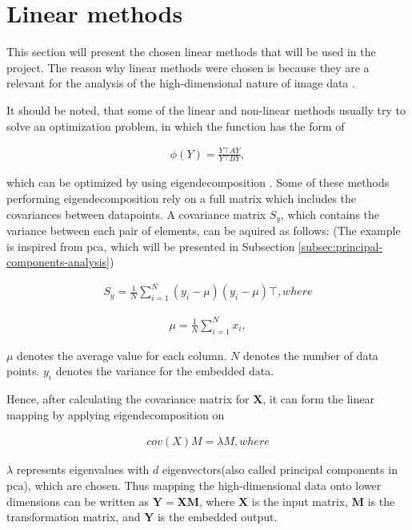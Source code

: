 \section{Linear methods}\label{sec:linear-methods}
This section will present the chosen linear methods that will be used in the project. The reason why linear methods were chosen is because they are a relevant for the analysis of the high-dimensional nature of image data \cite{linear-dimensionality-reduction-insights}.

It should be noted, that some of the linear and non-linear methods usually try to solve an optimization problem, in which the function has the form of


\begin{align}
  \phi(Y) = \frac{Y \top AY}{Y \top BY},
\end{align}


which can be optimized by using eigendecomposition \cite{dimensionality-reduction-comparative-review}. Some of these methods performing eigendecomposition rely on a full matrix which includes the covariances between datapoints. A covariance matrix $S_y$, which contains the variance between each pair of elements, can be aquired as follows: (The example is inspired from \gls{pca}, which will be presented in Subsection \ref{subsec:principal-components-analysis})


\begin{align}
  S_y = \frac{1}{N}\sum\limits_{i=1}^{N}(y_i - \mu)(y_i - \mu)\top, where
\end{align}


\begin{align}
  \mu = \frac{1}{N}\sum\limits_{i=1}^{N}x_i,
\end{align}


$\mu$ denotes the average value for each column. $N$ denotes the number of data points. $y_i$ denotes the variance for the embedded data.

Hence, after calculating the covariance matrix for $\mathbf{X}$, it can form the linear mapping by applying eigendecomposition on


\begin{align}
  cov(X)M = \lambda M, where
\end{align}


$\lambda$ represents eigenvalues with $d$ eigenvectors(also called principal components in \gls{pca}), which are chosen. Thus mapping the high-dimensional data onto lower dimensions can be written as $\mathbf{Y=XM}$, where $\mathbf{X}$ is the input matrix, $\mathbf{M}$ is the transformation matrix, and $\mathbf{Y}$ is the embedded output.

